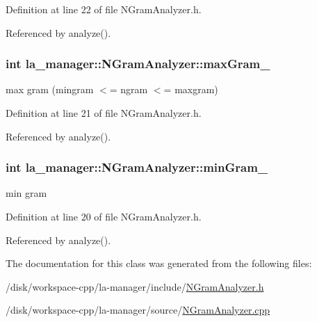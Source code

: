Definition at line 22 of file NGramAnalyzer.h.

Referenced by analyze().\hypertarget{classla__manager_1_1NGramAnalyzer_1e26dc15f529448357b98b716c3d38a8}{
\subsubsection[{maxGram\_\-}]{\setlength{\rightskip}{0pt plus 5cm}int {\bf la\_\-manager::NGramAnalyzer::maxGram\_\-}}}
\label{classla__manager_1_1NGramAnalyzer_1e26dc15f529448357b98b716c3d38a8}


max gram (mingram $<$= ngram $<$= maxgram) 



Definition at line 21 of file NGramAnalyzer.h.

Referenced by analyze().\hypertarget{classla__manager_1_1NGramAnalyzer_d126ddf018bf01f6438fcdb016617dfa}{
\subsubsection[{minGram\_\-}]{\setlength{\rightskip}{0pt plus 5cm}int {\bf la\_\-manager::NGramAnalyzer::minGram\_\-}}}
\label{classla__manager_1_1NGramAnalyzer_d126ddf018bf01f6438fcdb016617dfa}


min gram 



Definition at line 20 of file NGramAnalyzer.h.

Referenced by analyze().

The documentation for this class was generated from the following files:\begin{CompactItemize}
\item 
/disk/workspace-cpp/la-manager/include/\hyperlink{NGramAnalyzer_8h}{NGramAnalyzer.h}\item 
/disk/workspace-cpp/la-manager/source/\hyperlink{NGramAnalyzer_8cpp}{NGramAnalyzer.cpp}\end{CompactItemize}
